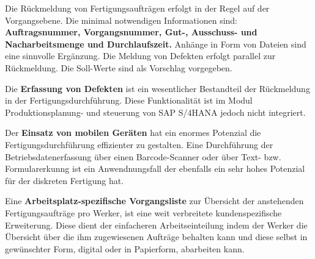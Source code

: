 \begin{definitionForm}[KA-P-6]
Die Rückmeldung von Fertigungsaufträgen erfolgt in der Regel auf der Vorgangsebene. Die minimal notwendigen Informationen sind: \textbf{Auftragsnummer, Vorgangsnummer, Gut-, Ausschuss- und Nacharbeitsmenge und Durchlaufszeit.}
Anhänge in Form von Dateien sind eine sinnvolle Ergänzung. Die Meldung von Defekten erfolgt parallel zur Rückmeldung. 
Die Soll-Werte sind als Vorschlag vorgegeben.
\end{definitionForm}

\begin{definitionForm}[KA-P-7]
Die \textbf{Erfassung von Defekten} ist ein wesentlicher Bestandteil der Rückmeldung in der Fertigungsdurchführung. Diese Funktionalität ist im Modul Produktionsplanung- und steuerung von SAP S/4HANA jedoch nicht integriert.
\end{definitionForm}

\begin{definitionForm}[KA-P-8]
Der \textbf{Einsatz von mobilen Geräten} hat ein enormes Potenzial die Fertigungsdurchführung effizienter zu gestalten. Eine Durchführung der Betriebsdatenerfassung über einen Barcode-Scanner oder über Text- bzw. Formularerkunng ist ein Anwendnungsfall der ebenfalls ein sehr hohes Potenzial für der diskreten Fertigung hat.
\end{definitionForm}

\begin{definitionForm}[KA-P-9]
Eine \textbf{Arbeitsplatz-spezifische Vorgangsliste} zur Übersicht der anstehenden Fertigungsaufträge pro Werker, ist eine weit verbreitete kundenspezifische Erweiterung. Diese dient der einfacheren Arbeitseinteilung indem der Werker die Übersicht über die ihm zugewiesenen Aufträge behalten kann und diese selbst in gewünschter Form, digital oder in Papierform, abarbeiten kann.
\end{definitionForm}